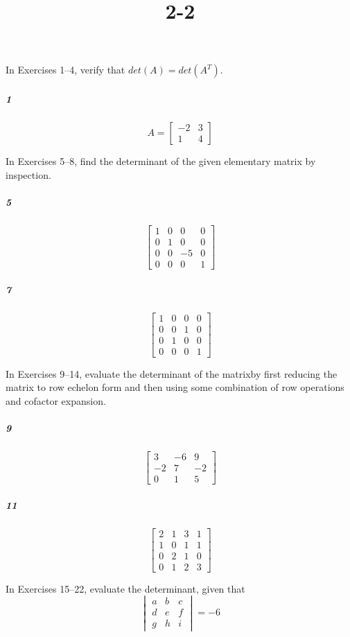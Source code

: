 \documentclass[fleqn]{article}
\title{2-2}
\begin{document}
\maketitle
\pagebreak
In Exercises 1–4, verify that $det(A) = det(A^T)$.

\subparagraph{1}

\[
A = \begin{bmatrix} -2 & 3 \\ 1 & 4 \end{bmatrix}
\]
\vfill

In Exercises 5–8, find the determinant of the given elementary matrix by inspection.

\subparagraph{5}

\[
\begin{bmatrix} 1 & 0 & 0 & 0 \\ 0 & 1 & 0 & 0 \\ 0 & 0 & -5 & 0 \\ 0 & 0 & 0 & 1 \end{bmatrix}
\]
\vfill


\pagebreak


\subparagraph{7}

\[
\begin{bmatrix} 1 & 0 & 0 & 0 \\ 0 & 0 & 1 & 0 \\ 0 & 1 & 0 & 0 \\ 0 & 0 & 0 & 1 \end{bmatrix}
\]
\vfill

In Exercises 9–14, evaluate the determinant of the matrixby first reducing the matrix to row echelon form and then using some combination of row operations and cofactor expansion.

\subparagraph{9}

\[
\begin{bmatrix} 3 & -6 & 9 \\ -2 & 7 & -2 \\ 0 & 1 & 5 \end{bmatrix}
\]
\vfill


\pagebreak


\subparagraph{11}

\[
\begin{bmatrix} 2 & 1 & 3 & 1 \\ 1 & 0 & 1 & 1 \\ 0 & 2 & 1 & 0 \\ 0 & 1 & 2 & 3 \end{bmatrix}
\]
\vfill

In Exercises 15–22, evaluate the determinant, given that \[\begin{vmatrix} a & b & c \\ d & e & f \\ g & h & i \end{vmatrix} = -6\]
\end{document}
